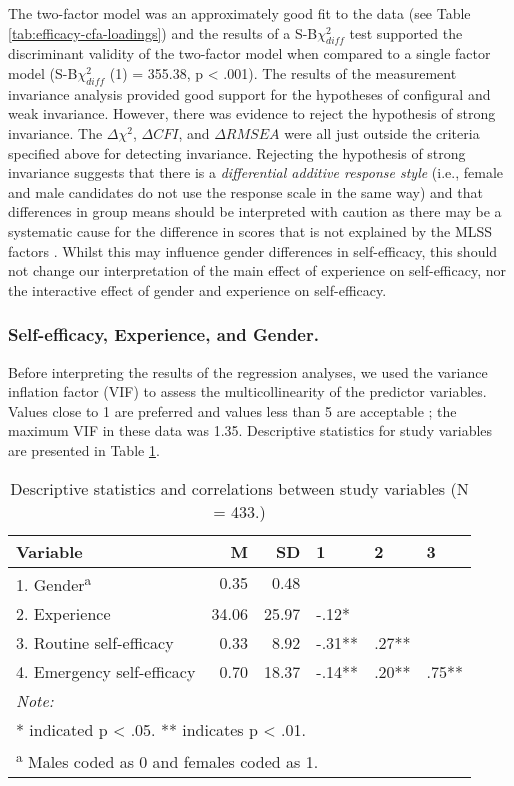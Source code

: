 \documentclass[
  12pt,
  a4paper,
]{book}
\begin{document}
The two-factor model was an approximately good fit to the data (see Table \ref{tab:efficacy-cfa-loadings}) and the results of a S-B\(\chi^2_{diff}\) test supported the discriminant validity of the two-factor model when compared to a single factor model (S-B\(\chi^2_{diff}\) (1) = 355.38, p \textless{} .001). The results of the measurement invariance analysis provided good support for the hypotheses of configural and weak invariance. However, there was evidence to reject the hypothesis of strong invariance. The \(\Delta\chi^2\), \(\Delta CFI\), and \(\Delta RMSEA\) were all just outside the criteria specified above for detecting invariance. Rejecting the hypothesis of strong invariance suggests that there is a \emph{differential additive response style} (i.e., female and male candidates do not use the response scale in the same way) and that differences in group means should be interpreted with caution as there may be a systematic cause for the difference in scores that is not explained by the MLSS factors \citep{Kline2016}. Whilst this may influence gender differences in self-efficacy, this should not change our interpretation of the main effect of experience on self-efficacy, nor the interactive effect of gender and experience on self-efficacy.

\hypertarget{self-efficacy-experience-and-gender.}{%
\subsubsection{Self-efficacy, Experience, and Gender.}\label{self-efficacy-experience-and-gender.}}

Before interpreting the results of the regression analyses, we used the variance inflation factor (VIF) to assess the multicollinearity of the predictor variables. Values close to 1 are preferred and values less than 5 are acceptable \citep{Tabachnick2007a}; the maximum VIF in these data was 1.35. Descriptive statistics for study variables are presented in Table \ref{tab:var-cor}.

\begin{table}[H]

\caption{\label{tab:var-cor}Descriptive statistics and correlations between study variables (N = 433.)}
\centering
\begin{tabular}[t]{lrrlll}
\toprule
Variable & M & SD & 1 & 2 & 3\\
\midrule
1. Gender\textsuperscript{a} & 0.35 & 0.48 &  &  & \\
2. Experience & 34.06 & 25.97 & -.12* &  & \\
3. Routine self-efficacy & 0.33 & 8.92 & -.31** & .27** & \\
4. Emergency self-efficacy & 0.70 & 18.37 & -.14** & .20** & .75**\\
\bottomrule
\multicolumn{6}{l}{\textit{Note: }}\\
\multicolumn{6}{l}{* indicated p < .05. ** indicates p < .01.}\\
\multicolumn{6}{l}{\textsuperscript{a} Males coded as 0 and females coded as 1.}\\
\end{tabular}
\end{table}
\end{document}
